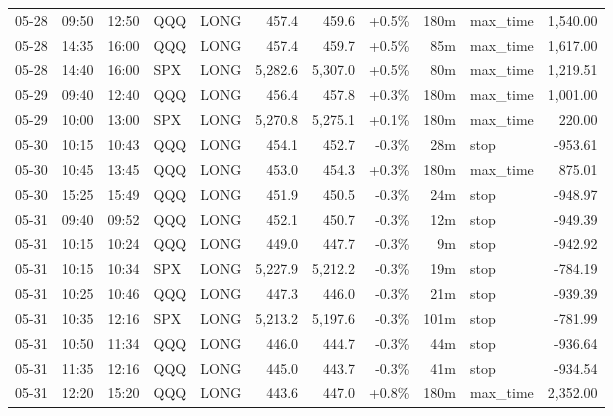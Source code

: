 \documentclass[11pt,a4paper,twoside]{article}
\begin{document}
\begin{center}
\begin{longtable}{>{\color{txtmain}}l l l l l r r r r >{\color{txtmain}}l r}
05-28 & 09:50 & 12:50 & QQQ & LONG & 457.4 & 459.6 & \textcolor{wingreen}{+0.5\%} & 180m & max\_time & \textcolor{wingreen}{1,540.00} \\
05-28 & 14:35 & 16:00 & QQQ & LONG & 457.4 & 459.7 & \textcolor{wingreen}{+0.5\%} & 85m & max\_time & \textcolor{wingreen}{1,617.00} \\
05-28 & 14:40 & 16:00 & SPX & LONG & 5,282.6 & 5,307.0 & \textcolor{wingreen}{+0.5\%} & 80m & max\_time & \textcolor{wingreen}{1,219.51} \\
05-29 & 09:40 & 12:40 & QQQ & LONG & 456.4 & 457.8 & \textcolor{wingreen}{+0.3\%} & 180m & max\_time & \textcolor{wingreen}{1,001.00} \\
05-29 & 10:00 & 13:00 & SPX & LONG & 5,270.8 & 5,275.1 & \textcolor{wingreen}{+0.1\%} & 180m & max\_time & \textcolor{wingreen}{220.00} \\
05-30 & 10:15 & 10:43 & QQQ & LONG & 454.1 & 452.7 & \textcolor{lossred}{-0.3\%} & 28m & stop & \textcolor{lossred}{-953.61} \\
05-30 & 10:45 & 13:45 & QQQ & LONG & 453.0 & 454.3 & \textcolor{wingreen}{+0.3\%} & 180m & max\_time & \textcolor{wingreen}{875.01} \\
05-30 & 15:25 & 15:49 & QQQ & LONG & 451.9 & 450.5 & \textcolor{lossred}{-0.3\%} & 24m & stop & \textcolor{lossred}{-948.97} \\
05-31 & 09:40 & 09:52 & QQQ & LONG & 452.1 & 450.7 & \textcolor{lossred}{-0.3\%} & 12m & stop & \textcolor{lossred}{-949.39} \\
05-31 & 10:15 & 10:24 & QQQ & LONG & 449.0 & 447.7 & \textcolor{lossred}{-0.3\%} & 9m & stop & \textcolor{lossred}{-942.92} \\
05-31 & 10:15 & 10:34 & SPX & LONG & 5,227.9 & 5,212.2 & \textcolor{lossred}{-0.3\%} & 19m & stop & \textcolor{lossred}{-784.19} \\
05-31 & 10:25 & 10:46 & QQQ & LONG & 447.3 & 446.0 & \textcolor{lossred}{-0.3\%} & 21m & stop & \textcolor{lossred}{-939.39} \\
05-31 & 10:35 & 12:16 & SPX & LONG & 5,213.2 & 5,197.6 & \textcolor{lossred}{-0.3\%} & 101m & stop & \textcolor{lossred}{-781.99} \\
05-31 & 10:50 & 11:34 & QQQ & LONG & 446.0 & 444.7 & \textcolor{lossred}{-0.3\%} & 44m & stop & \textcolor{lossred}{-936.64} \\
05-31 & 11:35 & 12:16 & QQQ & LONG & 445.0 & 443.7 & \textcolor{lossred}{-0.3\%} & 41m & stop & \textcolor{lossred}{-934.54} \\
05-31 & 12:20 & 15:20 & QQQ & LONG & 443.6 & 447.0 & \textcolor{wingreen}{+0.8\%} & 180m & max\_time & \textcolor{wingreen}{2,352.00} \\

\end{longtable}
\end{center}
\end{document}
